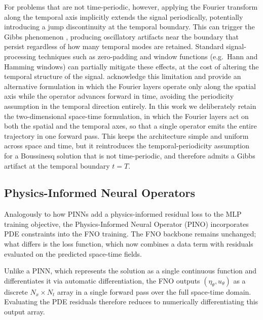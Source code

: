 For problems that are not time-periodic, however, applying the Fourier transform along the temporal axis implicitly extends the signal periodically, potentially introducing a jump discontinuity at the temporal boundary. This can trigger the Gibbs phenomenon \parencite{gibbs1899}, producing oscillatory artifacts near the boundary that persist regardless of how many temporal modes are retained. Standard signal-processing techniques such as zero-padding and window functions (e.g.\ Hann and Hamming windows) can partially mitigate these effects, at the cost of altering the temporal structure of the signal. \textcite{li2021} acknowledge this limitation and provide an alternative formulation in which the Fourier layers operate only along the spatial axis while the operator advances forward in time, avoiding the periodicity assumption in the temporal direction entirely. In this work we deliberately retain the two-dimensional space-time formulation, in which the Fourier layers act on both the spatial and the temporal axes, so that a single operator emits the entire trajectory in one forward pass. This keeps the architecture simple and uniform across space and time, but it reintroduces the temporal-periodicity assumption for a Boussinesq solution that is not time-periodic, and therefore admits a Gibbs artifact at the temporal boundary $t = T$.

\subsection{Physics-Informed Neural Operators}
\label{subsec:pino}

Analogously to how PINNs add a physics-informed residual loss to the MLP training objective, the Physics-Informed Neural Operator (PINO) \parencite{li2023pino} incorporates PDE constraints into the FNO training. The FNO backbone remains unchanged; what differs is the loss function, which now combines a data term with residuals evaluated on the predicted space-time fields.

Unlike a PINN, which represents the solution as a single continuous function and differentiates it via automatic differentiation, the FNO outputs $(\eta_\theta, u_\theta)$ as a discrete $N_x \times N_t$ array in a single forward pass over the full space-time domain. Evaluating the PDE residuals therefore reduces to numerically differentiating this output array.

